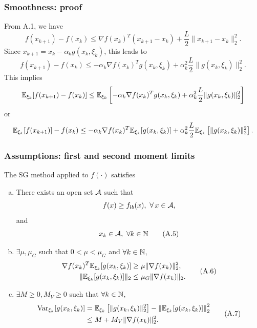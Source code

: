 \documentclass[usepdftitle=false, aspectratio=169]{beamer}
\begin{document}
\begin{frame}
	\frametitle{Smoothness: proof}
	
	From A.1, we have
	$$
	f(x_{k+1}) - f(x_k) \leq \nabla f(x_k)^T (x_{k+1} - x_k) + \frac{L}{2} \| x_{k+1} - x_k \|^2_2.
	$$
	Since $x_{k+1} = x_k - \alpha_k g(x_k, \xi_k)$, this leads to
	$$
	f(x_{k+1}) - f(x_k) \leq - \alpha_k \nabla f(x_k)^T g(x_k, \xi_k) + \alpha_k^2 \frac{L}{2} \| g(x_k, \xi_k) \|^2_2.
	$$
	This implies
    $$
		{\mathbb{E}}_{\xi_k} [f(x_{k+1}) - f(x_k)] \leq {\mathbb{E}}_{\xi_k} \left[ - \alpha_k \nabla f(x_k)^T g(x_k, \xi_k) + \alpha_k^2 \frac{L}{2} \| g(x_k, \xi_k) \|^2_2 \right]
	$$
	or
	$$
		{\mathbb{E}}_{\xi_k} [f(x_{k+1})] - f(x_k) \leq - \alpha_k \nabla f(x_k)^T {\mathbb{E}}_{\xi_k} [ g(x_k, \xi_k) ] + \alpha_k^2 \frac{L}{2} {\mathbb{E}}_{\xi_k} \left[ \| g(x_k, \xi_k) \|^2_2 \right].	
	$$
	
\end{frame}

\begin{frame}
\frametitle{Assumptions: first and second moment limits}

The SG method applied to $f(\cdot)$ satisfies
\begin{enumerate}[a)]
\item
There exists an open set ${\mathcal{A}}$ such that
$$
f(x) \geq f_{lb}(x),\ \forall\, x \in {\mathcal{A}},
$$
and
\begin{equation}
x_k \in \calA,\ \forall k \in \NN
\tag{A.5}
\label{ass:open_set}
\end{equation}
\item
$\exists \mu, \mu_G$ such that $0 < \mu < \mu_G$ and $\forall k \in {\mathbb{N}}$,
\begin{equation}
\begin{aligned}
\nabla f(x_k)^T {\mathbb{E}}_{\xi_k} [g(x_k, \xi_k)] &\geq \mu \| \nabla f(x_k) \|_2^2, \\
\| {\mathbb{E}}_{\xi_k} [g(x_k, \xi_k)] \|_2 &\leq \mu_G \| \nabla f(x_k) \|_2.
\end{aligned}
\tag{A.6}
\label{ass:sufficient_descent}
\end{equation}
\item
$\exists M \geq 0, M_V \geq 0$ such that $\forall k \in {\mathbb{N}}$,
\begin{equation}
	\begin{aligned}
\operatorname{Var}_{\xi_k} [g(x_k, \xi_k)]
&= {\mathbb{E}}_{\xi_k} \left[ \| g(x_k, \xi_k) \|^2_2 \right] - \left\| {\mathbb{E}}_{\xi_k} [ g(x_k, \xi_k) ] \right\|^2_2 \\
&\leq M + M_V \| \nabla f(x_k) \|_2^2.
\end{aligned}
\tag{A.7}
\label{ass:varg}
\end{equation}
\end{enumerate}
	
\end{frame}
\end{document}
